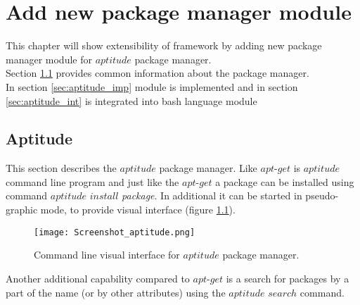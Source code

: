
\chapter{Add new package manager module}\label{chap:add}
This chapter will show extensibility of framework by adding new package manager module for $aptitude$ package manager.\\
Section \ref{sec:aptitude} provides common information about the package manager.\\
In section \ref{sec:aptitude_imp} module is implemented and in section \ref{sec:aptitude_int} is integrated into bash language module

\section{Aptitude}\label{sec:aptitude}
This section describes the $aptitude$ package manager.
Like $apt$-$get$ is $aptitude$ command line program and just like the $apt$-$get$ a package can be installed using command $aptitude$ $install$ \emph{package}. In additional it can be started in pseudo-graphic mode, to provide visual interface (figure \ref{fig:aptitude_gui}).
\begin{figure}[ht]   
	\centering
	\texttt{[image: Screenshot\_aptitude.png]}
	\caption{Command line visual interface for $aptitude$ package manager.}
	\label{fig:aptitude_gui}
\end{figure}
Another additional capability compared to $apt$-$get$ is a search for packages by a part of the name (or by other attributes) using the $aptitude$ $search$ command.
